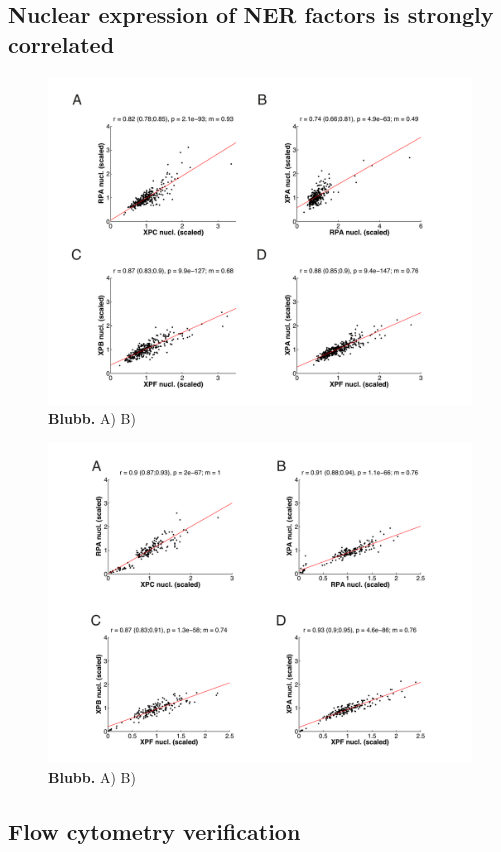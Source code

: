 \subsection{Nuclear expression of NER factors is strongly correlated}

\begin{figure}[htbp]
	\begin{center}
		\includegraphics[width=1\textwidth]{Abbildungen/figure4_2.pdf}
		\caption{\textbf{Blubb.} A) B) }
		\label{fig:coExpressionData}
	\end{center}
\end{figure}


\begin{figure}[htbp]
	\begin{center}
		\includegraphics[width=1\textwidth]{Abbildungen/figure4_3.pdf}
		\caption{\textbf{Blubb.} A) B) }
		\label{fig:coExpressionData_woDamage}
	\end{center}
\end{figure}

\subsection{Flow cytometry verification}

